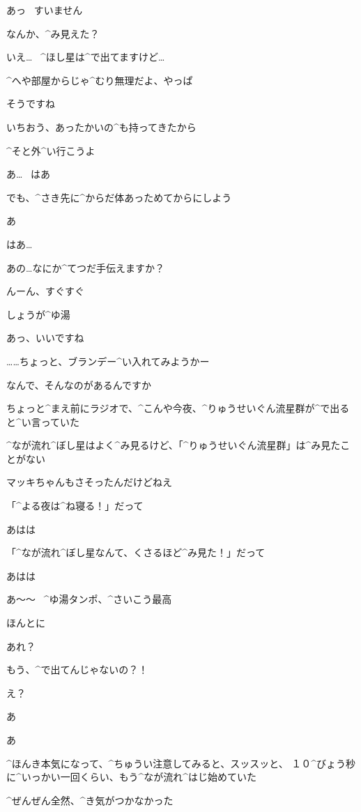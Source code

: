 \K あっ
\ すいません

\A なんか、^{み}{見}えた？

\K いえ…
\ ^{ほし}{星}は^{で}{出}てますけど…

\A ^{へや}{部屋}からじゃ^{むり}{無理}だよ、やっぱ

\K そうですね

\page
\A いちおう、あったかいの^{も}{持}ってきたから

\A ^{そと}{外}^{い}{行}こうよ

\K あ…
\ はあ

\A でも、^{さき}{先}に^{からだ}{体}あっためてからにしよう

\K あ

\K はあ…

\K あの…なにか^{てつだ}{手伝}えますか？

\A んーん、すぐすぐ

\page
\A しょうが^{ゆ}{湯}

\K あっ、いいですね

\A ……ちょっと、ブランデー^{い}{入}れてみようかー

\K なんで、そんなのがあるんですか

\page
\A ちょっと^{まえ}{前}にラジオで、^{こんや}{今夜}、^{りゅうせいぐん}{流星群}が^{で}{出}ると^{い}{言}っていた

\A ^{なが}{流}れ^{ぼし}{星}はよく^{み}{見}るけど、「^{りゅうせいぐん}{流星群}」は^{み}{見}たことがない

\A マッキちゃんもさそったんだけどねえ

\A 「^{よる}{夜}は^{ね}{寝}る！」だって

\K あはは

\A 「^{なが}{流}れ^{ぼし}{星}なんて、くさるほど^{み}{見}た！」だって

\K あはは

\page[106]
\A あ〜〜
\ ^{ゆ}{湯}タンポ、^{さいこう}{最高}

\K ほんとに

\page
\A あれ？

\A もう、^{で}{出}てんじゃないの？！

\K え？

\A あ

\K あ

\page
\A ^{ほんき}{本気}になって、^{ちゅうい}{注意}してみると、スッスッと、
１０^{びょう}{秒}に^{いっかい}{一回}くらい、もう^{なが}{流}れ^{はじ}{始}めていた

\A ^{ぜんぜん}{全然}、^{き}{気}がつかなかった

